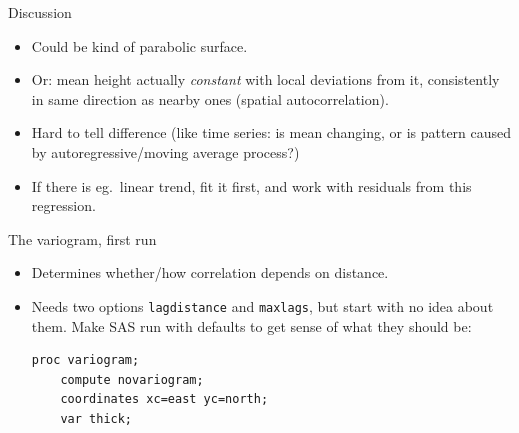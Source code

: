 \begin{frame}{Discussion}

  \begin{itemize}
  \item Could be kind of parabolic surface.
  \item Or: mean height actually \emph{constant} with local deviations
    from it, consistently in same direction as nearby ones (spatial
    autocorrelation).
  \item Hard to tell difference (like time series: is mean changing,
    or is pattern caused by autoregressive/moving average process?)
  \item If there is eg.\ linear trend, fit it first, and work with
    residuals from this regression.
  \end{itemize}
  
\end{frame}

\begin{frame}[fragile]{The variogram, first run}

  \begin{itemize}
  \item Determines whether/how correlation depends on distance.
  \item Needs two options \texttt{lagdistance} and \texttt{maxlags},
    but start with no idea about them. Make SAS run with defaults to
    get sense of what they should be:

\begin{verbatim}
proc variogram;
    compute novariogram;
    coordinates xc=east yc=north;
    var thick;
\end{verbatim}


  
  \end{itemize}
  
\end{frame}

